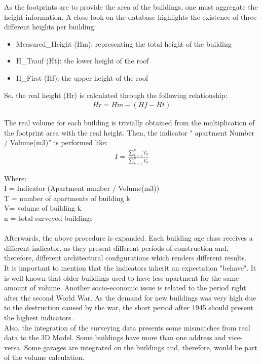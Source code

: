 As the footprints are  to provide the area of the buildings, one must aggregate the height information. A close look on the database highlights the existence of three different heights per building:
\begin{itemize}
\item Measured\_Height (Hm): representing the total height of the building
\item H\_Trauf (Ht): the lower height of the roof
\item H\_First (Hf): the upper height of the roof
\end{itemize}

So, the real height (Hr) is calculated through the following relationship:
\begin{align}
Hr=Hm-(Hf-Ht)
\end{align}


The real volume for each building is trivially obtained from the multiplication of the footprint area with the real height. Then, the indicator " apartment Number / Volume(m3)” is performed like:\\
\begin{align}
I = \frac {\sum\limits_{k=1}^n T_{k}}{\sum\limits_{k=1}^n V_{k}}
\end{align}


Where:\\
I = Indicator (Apartment number / Volume(m3))\\
T = number of apartments of building k\\
V= volume of building k\\
n = total surveyed buildings\\
\\
Afterwards, the above procedure is expanded. Each building age class receives a different indicator, as they present different periods of construction and, therefore, different architectural configurations which renders different results.\\

It is important to mention that the indicators inherit an expectation "behave". It is well known that older buildings used to have less apartment for the same amount of volume. Another socio-economic issue is related to the period right after the second World War. As the demand for new buildings was very high due to the destruction caused by the war, the short period after 1945 should present the highest indicators. \\

Also, the integration of the surveying data presents some mismatches from real data to the 3D Model. Some buildings have more than one address and vice-versa. Some garages are integrated on the buildings and, therefore, would be part of the volume calculation.\\

